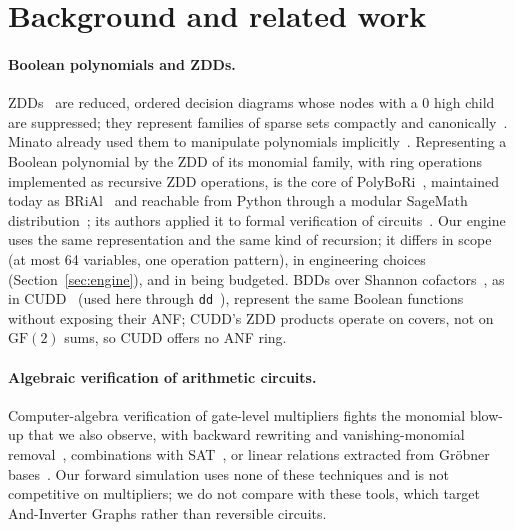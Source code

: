 \documentclass[10pt,a4paper]{article}
\theoremstyle{definition}
\newcommand{\GF}{\mathrm{GF}(2)}
\begin{document}
\section{Background and related work}\label{sec:related}

\paragraph{Boolean polynomials and ZDDs.} ZDDs~\cite{minato1993zdd} are reduced, ordered
decision diagrams whose nodes with a $0$ high child are suppressed; they represent families of
sparse sets compactly and canonically~\cite{minato2001zdd}. Minato already used them to
manipulate polynomials implicitly~\cite{minato1995polynomials}. Representing a Boolean
polynomial by the ZDD of its monomial family, with ring operations implemented as recursive
ZDD operations, is the core of PolyBoRi~\cite{brickenstein2009polybori}, maintained today as
BRiAl~\cite{brial} and reachable from Python through a modular SageMath
distribution~\cite{passagemath}; its authors applied it to formal verification of
circuits~\cite{brickenstein2008groebner}. Our engine uses the same representation and the
same kind of recursion; it differs in scope (at most 64 variables, one operation pattern), in
engineering choices (Section~\ref{sec:engine}), and in being budgeted. BDDs over Shannon
cofactors~\cite{bryant1986graph}, as in CUDD~\cite{somenzi2015cudd} (used here through
\texttt{dd}~\cite{dd060}), represent the same Boolean functions without exposing their ANF;
CUDD's ZDD products operate on covers, not on $\GF$ sums, so CUDD offers no ANF ring.

\paragraph{Algebraic verification of arithmetic circuits.} Computer-algebra verification of
gate-level multipliers fights the monomial blow-up that we also observe, with
backward rewriting and vanishing-monomial removal~\cite{mahzoon2022revsca2}, combinations with
SAT~\cite{kaufmann2023amulet2}, or linear relations extracted from Gr\"obner
bases~\cite{kaufmann2025linear}. Our forward simulation uses none of these techniques and is
not competitive on multipliers; we do not compare with these tools, which target
And-Inverter Graphs rather than reversible circuits.
\end{document}
